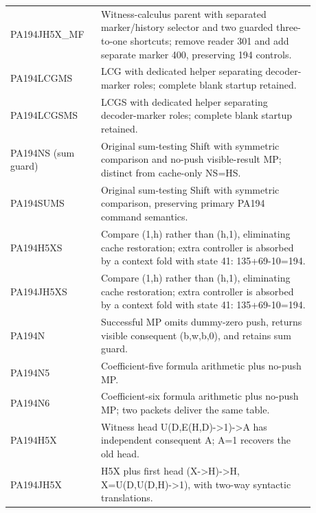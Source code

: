 \begin{longtable}{p{0.24\linewidth}p{0.64\linewidth}}
PA194JH5X\_MF & Witness-calculus parent with separated marker/history selector and two guarded three-to-one shortcuts; remove reader 301 and add separate marker 400, preserving 194 controls.\\[4pt]
PA194LCGMS & LCG with dedicated helper separating decoder-marker roles; complete blank startup retained.\\[4pt]
PA194LCGSMS & LCGS with dedicated helper separating decoder-marker roles; complete blank startup retained.\\[4pt]
PA194NS (sum guard) & Original sum-testing Shift with symmetric comparison and no-push visible-result MP; distinct from cache-only NS=HS.\\[4pt]
PA194SUMS & Original sum-testing Shift with symmetric comparison, preserving primary PA194 command semantics.\\[4pt]
PA194H5XS & Compare (1,h) rather than (h,1), eliminating cache restoration; extra controller is absorbed by a context fold with state 41: 135+69-10=194.\\[4pt]
PA194JH5XS & Compare (1,h) rather than (h,1), eliminating cache restoration; extra controller is absorbed by a context fold with state 41: 135+69-10=194.\\[4pt]
PA194N & Successful MP omits dummy-zero push, returns visible consequent (b,w,b,0), and retains sum guard.\\[4pt]
PA194N5 & Coefficient-five formula arithmetic plus no-push MP.\\[4pt]
PA194N6 & Coefficient-six formula arithmetic plus no-push MP; two packets deliver the same table.\\[4pt]
PA194H5X & Witness head U(D,E(H,D)->1)->A has independent consequent A; A=1 recovers the old head.\\[4pt]
PA194JH5X & H5X plus first head (X->H)->H, X=U(D,U(D,H)->1), with two-way syntactic translations.\\[4pt]
\end{longtable}
\endgroup
